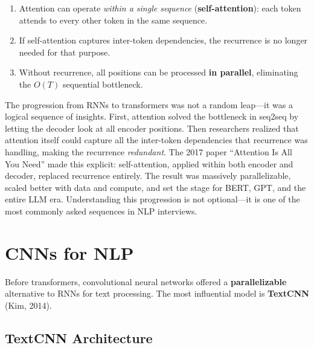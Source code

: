 \begin{enumerate}[leftmargin=*]
\item Attention can operate \emph{within a single sequence}
  (\textbf{self-attention}): each token attends to every other token in
  the same sequence.
\item If self-attention captures inter-token dependencies, the recurrence
  is no longer needed for that purpose.
\item Without recurrence, all positions can be processed \textbf{in
  parallel}, eliminating the $O(T)$ sequential bottleneck.
\end{enumerate}

\begin{keyinsight}
The progression from RNNs to transformers was not a random leap---it was a
logical sequence of insights.  First, attention solved the bottleneck in
seq2seq by letting the decoder look at all encoder positions.  Then
researchers realized that attention itself could capture all the
inter-token dependencies that recurrence was handling, making the
recurrence \emph{redundant}.  The 2017 paper ``Attention Is All You Need''
made this explicit: self-attention, applied within both encoder and
decoder, replaced recurrence entirely.  The result was massively
parallelizable, scaled better with data and compute, and set the stage for
BERT, GPT, and the entire LLM era.  Understanding this progression is not
optional---it is one of the most commonly asked sequences in NLP
interviews.
\end{keyinsight}


\section{CNNs for NLP}
\label{sec:cnn_nlp}

Before transformers, convolutional neural networks offered a
\textbf{parallelizable} alternative to RNNs for text processing.  The most
influential model is \textbf{TextCNN} (Kim, 2014).

\subsection{TextCNN Architecture}


